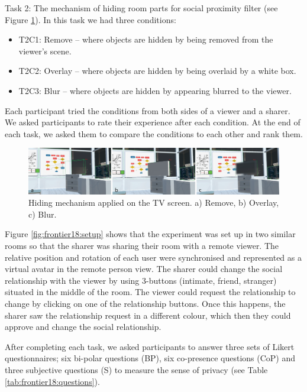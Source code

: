 Task 2:  The mechanism of hiding room parts for social proximity filter (see Figure \ref{fig:frontier18:hiding-mechanism}). In this task we had three conditions:

\begin{itemize}
\item T2C1: Remove – where objects are hidden by being removed from the viewer's scene.
\item T2C2: Overlay – where objects are hidden by being overlaid by a white box. 
\item T2C3: Blur – where objects are hidden by appearing blurred to the viewer. 
\end{itemize}

Each participant tried the conditions from both sides of a viewer and a sharer. We asked participants to rate their experience after each condition. At the end of each task, we asked them to compare the conditions to each other and rank them. 

\begin{figure}
\begin{center}
\includegraphics[width=\linewidth]{images/frontier18/images-01.png}
\caption{Hiding mechanism applied on the TV screen. a) Remove, b) Overlay, c) Blur.}\label{fig:frontier18:hiding-mechanism}
\end{center}
\end{figure}

Figure \ref{fig:frontier18:setup} shows that the experiment was set up in two similar rooms so that the sharer was sharing their room with a remote viewer. The relative position and rotation of each user were synchronised and represented as a virtual avatar in the remote person view. The sharer could change the social relationship with the viewer by using 3-buttons (intimate, friend, stranger) situated in the middle of the room. The viewer could request the relationship to change by clicking on one of the relationship buttons. Once this happens, the sharer saw the relationship request in a different colour, which then they could approve and change the social relationship.

After completing each task, we asked participants to answer three sets of Likert questionnaires; six bi-polar questions (BP), six co-presence questions (CoP) and three subjective questions (S) to measure the sense of privacy (see Table \ref{tab:frontier18:questions}).  

